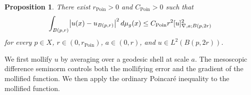 \documentclass[a4paper,oneside,12pt]{amsart}
\theoremstyle{plain}
\newtheorem{proposition}[theorem]{Proposition}
\theoremstyle{definition}
\theoremstyle{remark}
\DeclarePairedDelimiter{\abs}{\lvert}{\rvert}
\DeclarePairedDelimiter{\seminorm}{\lbrack}{\rbrack}
\newcommand{\dvol}{d\mu}
\newcommand{\mesoscopicdifferenceseminormLocal}[3][a]{\seminorm{#3}_{\nabla,#1;#2}}
\newcommand{\radiusPoincare}{r_{\mathrm{Poin}}}
\newcommand{\constantPoincare}{C_{\mathrm{Poin}}}
\begin{document}
\begin{proposition}\label{proposition: shell poincare inequality}
  There exist $\radiusPoincare > 0$ and $\constantPoincare > 0$ such that
  \begin{equation}
    \int_{B(p,r)} \abs*{u(x) - u_{B(p,r)}}^2 \,\dvol_g(x) \le \constantPoincare r^2 \mesoscopicdifferenceseminormLocal{B(p,2r)}{u}^2
  \end{equation}
  for every $p \in X$, $r \in (0,\radiusPoincare)$, $a \in (0,r)$, and $u \in L^2(B(p,2r))$.
\end{proposition}

We first mollify $u$ by averaging over a geodesic shell at scale $a$.
The mesoscopic difference seminorm controls both the mollifying error and the gradient of the mollified function.
We then apply the ordinary Poincar\'e inequality to the mollified function.
\end{document}
